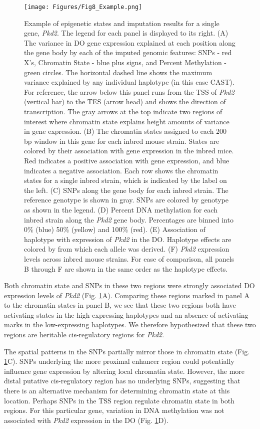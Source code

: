 \documentclass[
  11pt,
]{article}
\begin{document}
\begin{figure}[ht!]
\texttt{[image: Figures/Fig8\_Example.png]} 
\caption{Example of epigenetic states and imputation results for a single 
gene, \textit{Pkd2}. The legend for each panel is displayed to its right.
(A) The variance in DO gene expression explained at 
each position along the gene body by each of the imputed genomic 
features: SNPs - red X's, Chromatin State - blue plus signs, and 
Percent Methylation - green circles. The horizontal 
dashed line shows the maximum variance explained by any individual 
haplotype (in this case CAST). For reference, the arrow below 
this panel runs from the TSS of \textit{Pkd2} (vertical bar) to the 
TES (arrow head) and shows the direction of transcription. The 
gray arrows at the top indicate two regions of interest where 
chromatin state explains height amounts of variance in gene expression. 
(B) The chromatin states assigned to each 200 bp window in this gene 
for each inbred mouse strain. States are colored by their association 
with gene expression in the inbred mice. Red indicates a positive 
association with gene expression, and blue indicates a negative 
association. Each row shows the chromatin states for a single inbred 
strain, which is indicated by the label on the left. (C) SNPs along 
the gene body for each inbred strain. The reference genotype is shown 
in gray. SNPs are colored by genotype as shown in the legend. (D) Percent 
DNA methylation for each inbred strain along the \textit{Pkd2} gene body. 
Percentages are binned into 0\% (blue) 50\% (yellow) and 100\% (red). (E) 
Association of haplotype with expression of \textit{Pkd2} in the DO. Haplotype 
effects are colored by from which each allele was derived. (F) \textit{Pkd2} 
expression levels across inbred mouse strains. For ease of comparison, 
all panels B through F are shown in the same order as the haplotype effects.}
\label{fig:example_gene}
\end{figure}

Both chromatin state and SNPs in these two regions were strongly
associated DO expression levels of \textit{Pkd2} (Fig.
\ref{fig:example_gene}A). Comparing these regions marked in panel A to
the chromatin states in panel B, we see that these two regions both have
activating states in the high-expressing haplotypes and an absence of
activating marks in the low-expressing haplotypes. We therefore
hypothesized that these two regions are heritable cis-regulatory regions
for \textit{Pkd2}.

The spatial patterns in the SNPs partially mirror those in chromatin
state (Fig. \ref{fig:example_gene}C). SNPs underlying the more proximal
enhancer region could potentially influence gene expression by altering
local chromatin state. However, the more distal putative cis-regulatory
region has no underlying SNPs, suggesting that there is an alternative
mechanism for determining chromatin state at this location. Perhaps SNPs
in the TSS region regulate chromatin state in both regions. For this
particular gene, variation in DNA methylation was not associated with
\textit{Pkd2} expression in the DO (Fig. \ref{fig:example_gene}D).
\end{document}

